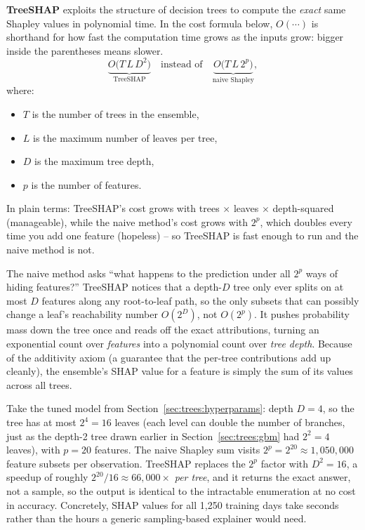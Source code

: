 \textbf{TreeSHAP} \citep{Lundberg2020} exploits the structure of decision
trees to compute the \emph{exact} same Shapley values in polynomial time.  In
the cost formula below, $O(\cdots)$ is shorthand for how fast the computation
time grows as the inputs grow: bigger inside the parentheses means slower.
\begin{equation}\label{eq:trees:treeshap_cost}
  \underbrace{O\!\big(T \, L \, D^2\big)}_{\text{TreeSHAP}}
  \quad\text{instead of}\quad
  \underbrace{O\!\big(T \, L \, 2^{p}\big)}_{\text{naive Shapley}},
\end{equation}
where:
\begin{itemize}[leftmargin=1.8em]
  \item $T$ is the number of trees in the ensemble,
  \item $L$ is the maximum number of leaves per tree,
  \item $D$ is the maximum tree depth,
  \item $p$ is the number of features.
\end{itemize}
In plain terms: TreeSHAP's cost grows with trees $\times$ leaves $\times$
depth-squared (manageable), while the naive method's cost grows with $2^p$,
which doubles every time you add one feature (hopeless) -- so TreeSHAP is fast
enough to run and the naive method is not.

\begin{intuition}
The naive method asks ``what happens to the prediction under all $2^p$
ways of hiding features?''  TreeSHAP notices that a depth-$D$ tree only ever
splits on at most $D$ features along any root-to-leaf path, so the only
subsets that can possibly change a leaf's reachability number $O(2^D)$, not
$O(2^p)$.  It pushes probability mass down the tree once and reads off the
exact attributions, turning an exponential count over \emph{features} into a
polynomial count over \emph{tree depth}.  Because of the additivity axiom
(a guarantee that the per-tree contributions add up cleanly), the ensemble's
SHAP value for a feature is simply the sum of its values across all trees.
\end{intuition}

\begin{workedexample}
Take the tuned model from Section~\ref{sec:trees:hyperparams}: depth $D = 4$,
so the tree has at most $2^4 = 16$ leaves (each level can double the number
of branches, just as the depth-2 tree drawn earlier in
Section~\ref{sec:trees:gbm} had $2^2 = 4$ leaves), with $p = 20$ features.
The naive Shapley sum visits $2^{p} = 2^{20} \approx 1{,}050{,}000$ feature
subsets per observation.  TreeSHAP replaces the $2^p$ factor with
$D^2 = 16$, a speedup of roughly $2^{20}/16 \approx 66{,}000\times$
\emph{per tree}, and it returns the exact answer, not a sample, so the
output is identical to the intractable enumeration at no cost in accuracy.
Concretely, SHAP values for all 1{,}250
training days take seconds rather than the hours a generic
sampling-based explainer would need.
\end{workedexample}

